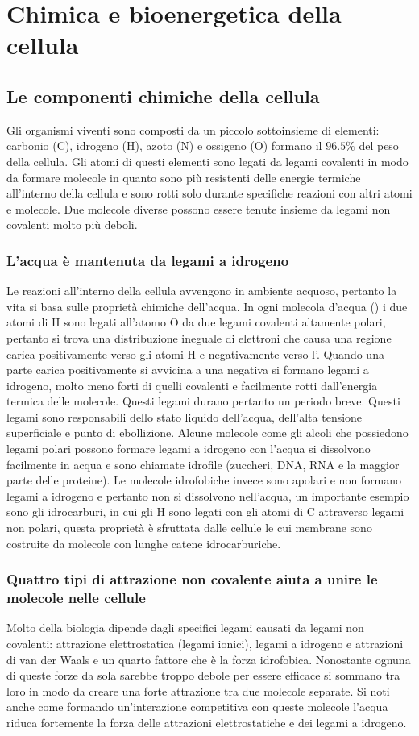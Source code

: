 \chapter{Chimica e bioenergetica della cellula}
\section{Le componenti chimiche della cellula}
Gli organismi viventi sono composti da un piccolo sottoinsieme di elementi: carbonio (C), idrogeno (H), azoto (N) e ossigeno (O) formano il $96.5\%$ del peso della cellula. Gli atomi di
questi elementi sono legati da legami covalenti in modo da formare molecole in quanto sono pi\`u resistenti delle energie termiche all'interno della cellula e sono rotti solo durante
specifiche reazioni con altri atomi e molecole. Due molecole diverse possono essere tenute insieme da legami non covalenti molto pi\`u deboli.
\subsection{L'acqua \`e mantenuta da legami a idrogeno}
Le reazioni all'interno della cellula avvengono in ambiente acquoso, pertanto la vita si basa sulle propriet\`a chimiche dell'acqua. In ogni molecola d'acqua () i due atomi di 
H sono legati all'atomo O da due legami covalenti altamente polari, pertanto si trova una distribuzione ineguale di elettroni che causa una regione carica positivamente verso gli atomi H
e negativamente verso l'. Quando una parte carica positivamente si avvicina a una negativa si formano legami a idrogeno, molto meno forti di quelli covalenti e facilmente rotti 
dall'energia termica delle molecole. Questi legami durano pertanto un periodo breve. Questi legami sono responsabili dello stato liquido dell'acqua, dell'alta tensione superficiale e 
punto di ebollizione. Alcune molecole come gli alcoli che possiedono legami polari possono formare legami a idrogeno con l'acqua si dissolvono facilmente in acqua e sono chiamate 
idrofile (zuccheri, DNA, RNA e la maggior parte delle proteine). Le molecole idrofobiche invece sono apolari e non formano legami a idrogeno e pertanto non si dissolvono nell'acqua, un
importante esempio sono gli idrocarburi, in cui gli H sono legati con gli atomi di C attraverso legami non polari, questa propriet\`a \`e sfruttata dalle cellule le cui membrane sono 
costruite da molecole con lunghe catene idrocarburiche.
\subsection{Quattro tipi di attrazione non covalente aiuta a unire le molecole nelle cellule}
Molto della biologia dipende dagli specifici legami causati da legami non covalenti: attrazione elettrostatica (legami ionici), legami a idrogeno e attrazioni di van der Waals e un 
quarto fattore che \`e la forza idrofobica. Nonostante ognuna di queste forze da sola sarebbe troppo debole per essere efficace si sommano tra loro in modo da creare una forte attrazione
tra due molecole separate. Si noti anche come formando un'interazione competitiva con queste molecole l'acqua riduca fortemente la forza delle attrazioni elettrostatiche e dei legami a 
idrogeno.
